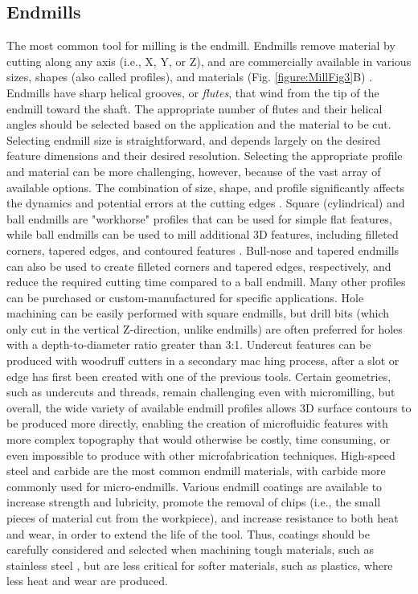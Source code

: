 \subsection{Endmills}
The most common tool for milling is the endmill. Endmills remove material by cutting along any axis (i.e., X, Y, or Z), and are commercially available in various sizes, shapes (also called profiles), and materials (Fig. \ref{figure:MillFig3}B) \cite{Kim2008}. Endmills have sharp helical grooves, or \textit{flutes}, that wind from the tip of the endmill toward the shaft. The appropriate number of flutes and their helical angles should be selected based on the application and the material to be cut. Selecting endmill size is straightforward, and depends largely on the desired feature dimensions and their desired resolution. Selecting the appropriate profile and material can be more challenging, however, because of the vast array of available options. The combination of size, shape, and profile significantly affects the dynamics and potential errors at the cutting edges \cite{Jun2006}. Square (cylindrical) and ball endmills are "workhorse" profiles that can be used for simple flat features, while ball endmills can be used to mill additional 3D features, including filleted corners, tapered edges, and contoured features \cite{Wilson2011}. Bull-nose and tapered endmills can also be used to create filleted corners and tapered edges, respectively, and reduce the required cutting time compared to a ball endmill. Many other profiles can be purchased or custom-manufactured for specific applications. Hole machining can be easily performed with square endmills, but drill bits (which only cut in the vertical Z-direction, unlike endmills) are often preferred for holes with a depth-to-diameter ratio greater than 3:1. Undercut features can be produced with woodruff cutters in a secondary mac hing process, after a slot or edge has first been created with one of the previous tools. Certain geometries, such as undercuts and threads, remain challenging even with micromilling, but overall, the wide variety of available endmill profiles allows 3D surface contours to be produced more directly, enabling the creation of microfluidic features with more complex topography that would otherwise be costly, time consuming, or even impossible to produce with other microfabrication techniques.
High-speed steel and carbide are the most common endmill materials, with carbide more commonly used for micro-endmills. Various endmill coatings are available to increase strength and lubricity, promote the removal of chips (i.e., the small pieces of material cut from the workpiece), and increase resistance to both heat and wear, in order to extend the life of the tool. Thus, coatings should be carefully considered and selected when machining tough materials, such as stainless steel \cite{Aramchareon2008, Endrino2006}, but are less critical for softer materials, such as plastics, where less heat and wear are produced. 
